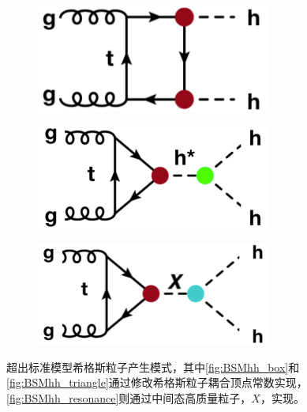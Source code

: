 \begin{figure}[h]
\centering
 \begin{subfigure}[b]{0.33\textwidth}
  \includegraphics[width=0.85\textwidth]{fig/BSM_hh1.png}
  \caption{}
  \label{fig:BSMhh_box}
  \label{fig:diagram_BSMhh_box}
 \end{subfigure}
 \begin{subfigure}[b]{0.33\textwidth}
  \includegraphics[width=0.85\textwidth]{fig/BSM_hh2.png}
  \caption{}
  \label{fig:BSMhh_triangle}
  \label{fig:diagram_BSMhh_triangle}
 \end{subfigure}
 \begin{subfigure}[b]{0.33\textwidth}
  \includegraphics[width=0.85\textwidth]{fig/BSM_hh3.png}
  \caption{}
  \label{fig:BSMhh_resonance}
 \label{fig:diagram_resonant_hh}
 \end{subfigure}
\caption{超出标准模型希格斯粒子产生模式，其中\ref{fig:BSMhh_box}和\ref{fig:BSMhh_triangle}通过修改希格斯粒子耦合顶点常数实现，\ref{fig:BSMhh_resonance}则通过中间态高质量粒子，$X$，实现。}
\label{fig:diagram_BSM_hh}
\end{figure}

